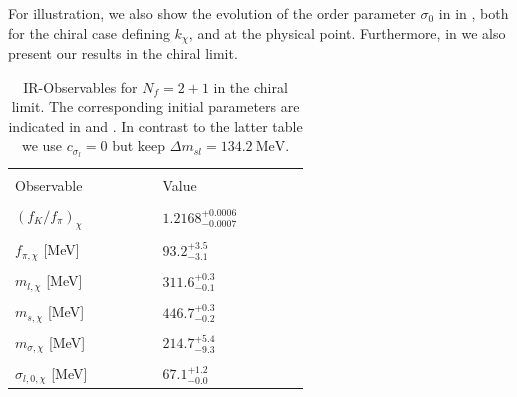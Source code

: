 \documentclass[aps,twocolumn,prd,superscriptaddress]{revtex4-2}
\begin{document}
For illustration, we also show the evolution of the order parameter $\sigma_0$ in  in , both for the chiral case defining $k_\chi$, and at the physical point. Furthermore, in  we also present our results in the chiral limit.
%
\begin{table}[t]\centering
	\begin{tabular}{|>{\centering}m{0.3\linewidth} | >{\centering\arraybackslash}m{0.3\linewidth} |}
		\hline & \\[-1ex]
		Observable & Value \\[0.5ex]
		\hline& \\[-1ex]
		$(f_K/f_\pi)_{\chi}$ & $1.2168^{+0.0006}_{-0.0007}$ \\[1ex]
		\hline& \\[-1.5ex]
		$f_{\pi,\chi}$ [MeV] & $93.2^{+3.5}_{-3.1}$	\\[1ex]
		\hline& \\[-1.5ex]
		$m_{l,\chi}$ [MeV]  & $311.6^{+0.3}_{-0.1}$	\\[1ex]
		\hline& \\[-1.5ex]
		$m_{s,\chi}$ [MeV]&  $446.7^{+0.3}_{-0.2}$ \\[1ex]
		\hline& \\[-1.5ex]
		$m_{\sigma,\chi}$ [MeV]&  $214.7^{+5.4}_{-9.3}$ \\[1ex]
		\hline& \\[-1.5ex]
		$\sigma_{l,0,\chi}$ [MeV] & $67.1^{+1.2}_{-0.0}$	\\[1ex]
		\hline
	\end{tabular}
	\caption{IR-Observables for $N_f = 2 +1$ in the chiral limit. The corresponding initial parameters are indicated in  and . In contrast to the latter table we use $c_{\sigma_l} = 0$ but keep $\Delta m_{sl} = \qty{134.2}{\MeV}$.
		\hspace*{\fill}	
		\label{tab:resultsChiral} }
\end{table}
%


\end{document}
